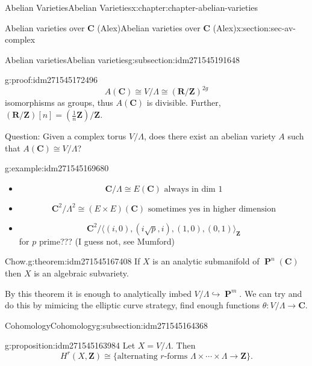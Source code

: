 \documentclass[oneside,10pt,]{book}
\numberwithin{equation}{section}
\newcommand{\lb}{[}
\newcommand{\rb}{]}
\newcommand{\ZZ}{\mathbf{Z}}
\newcommand{\RR}{\mathbf{R}}
\newcommand{\CC}{\mathbf{C}}
\DeclareMathOperator{\PP}{\mathbf{P}}
\begin{document}
\begin{chapterptx}{Abelian Varieties}{}{Abelian Varieties}{}{}{x:chapter:chapter-abelian-varieties}
\begin{sectionptx}{Abelian varieties over \(\CC\) (Alex)}{}{Abelian varieties over \(\CC\) (Alex)}{}{}{x:section:sec-av-complex}
\begin{subsectionptx}{Abelian varieties}{}{Abelian varieties}{}{}{g:subsection:idm271545191648}
\begin{proofptx}{}{g:proof:idm271545172496}
%
\begin{equation*}
A(\CC)  \cong V/\Lambda \cong (\RR/\ZZ)^{2g}
\end{equation*}
isomorphisms as groups, thus \(A(\CC)\) is divisible. Further, \((\RR/\ZZ)\lb n \rb = (\frac 1n \ZZ)/\ZZ\).%
\end{proofptx}
Question: Given a complex torus \(V/\Lambda\), does there exist an abelian variety \(A\) such that \(A(\CC) \cong V/\Lambda\)?%
\begin{example}{}{g:example:idm271545169680}%
%
\begin{itemize}[label=\textbullet]
\item{}%
\begin{equation*}
\CC/\Lambda \cong E(\CC) \text{ always in dim 1}
\end{equation*}
%
\item{}%
\begin{equation*}
\CC^2/\Lambda^2 \cong (E\times E)(\CC) \text{ sometimes yes in higher dimension}
\end{equation*}
%
\item{}%
\begin{equation*}
\CC^2/\langle (i, 0), (i\sqrt p, i), (1, 0), (0, 1)\rangle_\ZZ
\end{equation*}
for \(p\) prime??? (I guess not, see Mumford)%
\end{itemize}
%
\end{example}
\begin{theorem}{Chow.}{}{g:theorem:idm271545167408}%
If \(X\) is an analytic submanifold of \(\PP^n(\CC)\) then \(X\) is an algebraic subvariety.%
\end{theorem}
By this theorem it is enough to analytically imbed \(V/\Lambda \hookrightarrow \PP^m\). We can try and do this by mimicing the elliptic curve strategy, find enough functions \(\theta \colon V/\Lambda \to \CC\).%
\end{subsectionptx}
%
%
\typeout{************************************************}
\typeout{************************************************}
%
\begin{subsectionptx}{Cohomology}{}{Cohomology}{}{}{g:subsection:idm271545164368}
\begin{proposition}{}{}{g:proposition:idm271545163984}%
Let \(X = V/\Lambda\). Then%
\begin{equation*}
H^r (X,\ZZ) \cong \{\text{alternating }r\text{-forms } \Lambda\times\cdots\times\Lambda\to \ZZ\}\text{.}
\end{equation*}

\end{proposition}
\end{subsectionptx}
\end{sectionptx}
\end{chapterptx}
\end{document}
